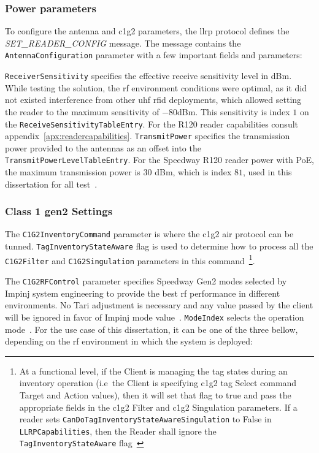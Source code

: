 \subsubsection{Power parameters}

To configure the antenna and \ac{c1g2} parameters, the \ac{llrp} protocol defines the \textit{SET\_READER\_CONFIG} message. The message contains the \texttt{AntennaConfiguration} parameter with a few important fields and parameters:

\texttt{ReceiverSensitivity} specifies the effective receive sensitivity level in dBm. While testing the solution, the \ac{rf} environment conditions were optimal, as it did not existed interference from other \ac{uhf} \ac{rfid} deployments, which allowed setting the reader to the maximum sensitivity of $-80$dBm. This sensitivity is index $1$ on the \texttt{ReceiveSensitivityTableEntry}. For the R120 reader capabilities consult appendix~\ref{apx:readercapabilities}.
\texttt{TransmitPower} specifies the transmission power provided to the antennas as an offset into the \texttt{TransmitPowerLevelTableEntry}. For the Speedway R120 reader power with PoE, the maximum transmission power is $30$ dBm, which is index $81$, used in this dissertation for all test~\cite{ImpinjOctaneLLRP, SettingReceiveSensitivity}.

\subsubsection{Class 1 \ac{gen2} Settings}

The \texttt{C1G2InventoryCommand} parameter is where the \ac{c1g2} air protocol can be tunned.
\texttt{TagInventoryStateAware} flag is used to determine how to process all the \texttt{C1G2Filter} and \texttt{C1G2Singulation} parameters in this command~\footnote{At a functional level, if the Client is managing the tag states during an inventory operation (i.e\ the Client is specifying \ac{c1g2} tag Select command Target and Action values), then it will set that flag to true and pass the appropriate fields in the \ac{c1g2} Filter and \ac{c1g2} Singulation parameters. If a reader sets \texttt{CanDoTagInventoryStateAwareSingulation} to False in \texttt{LLRPCapabilities}, then the Reader shall ignore the \texttt{TagInventoryStateAware} flag~\cite{LowLevelReader}}.

The \texttt{C1G2RFControl} parameter specifies Speedway Gen2 modes selected by Impinj system engineering to provide the best \ac{rf} performance in different environments. No Tari adjustment is necessary and any value passed by the client will be ignored in favor of Impinj mode value~\cite{ImpinjOctaneLLRP}.
\texttt{ModeIndex} selects the operation mode~\cite{ReaderModesMade, ImpinjOctaneLLRP}. For the use case of this dissertation, it can be one of the three bellow, depending on the \ac{rf} environment in which the system is deployed:

